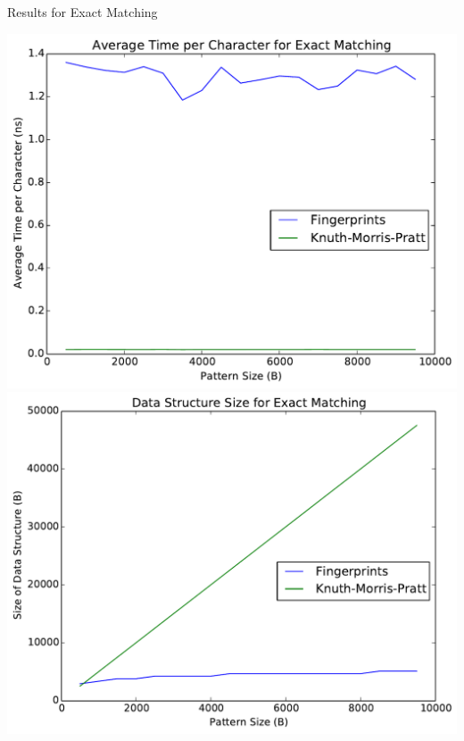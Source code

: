 \documentclass[ %
                    author={Dominic Moylett},
                supervisor={Dr. Raphael Clifford, Dr. Markus Jalsenius and Dr. Benjamin Sach},
                     title={An Empirical Analysis of Data Streaming Algorithms},
                  subtitle={},
                    degree={MEng},
                      year={2014} ]{poster}
\begin{document}
\begin{frame}{}
\begin{columns}[t]
  \begin{column}{0.422\linewidth}
  \begin{block}{\Large Results for Exact Matching}
  \begin{center}
  \includegraphics[scale=0.6]{exact_run_time}\includegraphics[scale=0.6]{exact_size}
  \end{center}
  \end{block}
  \end{column}
\end{columns}

\vfill


\end{frame}
\end{document}
